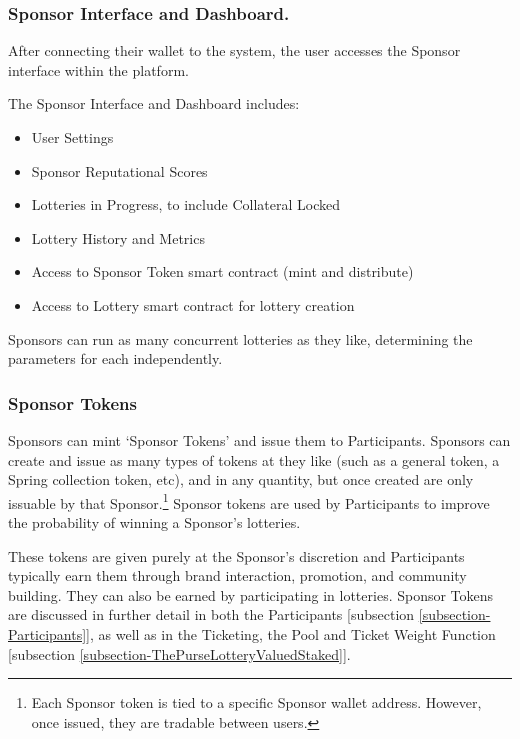 \documentclass[runningheads]{llncs}
\begin{document}
\subsubsection{Sponsor Interface and Dashboard.}  After connecting their wallet to the system, the user accesses the Sponsor interface within the platform.  

The Sponsor Interface and Dashboard includes:
\begin{itemize}
\item User Settings 
\item Sponsor Reputational Scores
\item Lotteries in Progress, to include Collateral Locked
\item Lottery History and Metrics
\item Access to Sponsor Token smart contract (mint and distribute)
\item Access to Lottery smart contract for lottery creation
\end{itemize}

Sponsors can run as many concurrent lotteries as they like, determining the parameters for each independently.

\subsubsection{Sponsor Tokens}  Sponsors can mint ‘Sponsor Tokens’ and issue them to Participants.  Sponsors can create and issue as many types of tokens at they like (such as a general token, a Spring collection token, etc), and in any quantity, but once created are only issuable by that Sponsor.\footnote{Each Sponsor token is tied to a specific Sponsor wallet address.  However, once issued, they are tradable between users.}   Sponsor tokens are used by Participants to improve the probability of winning a Sponsor’s lotteries.  

These tokens are given purely at the Sponsor’s discretion and Participants typically earn them through brand interaction, promotion, and community building.  They can also be earned by participating in lotteries.  Sponsor Tokens are discussed in further detail in both the Participants [subsection \ref{subsection-Participants}], as well as in the Ticketing, the Pool and Ticket Weight Function [subsection \ref{subsection-ThePurseLotteryValuedStaked}].
\end{document}
